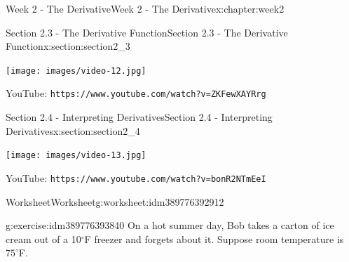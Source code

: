 \documentclass[oneside,10pt,]{book}
\newcommand{\mono}[1]{\texttt{#1}}
\numberwithin{equation}{section}
\newlength{\qrsize}
\newlength{\previewwidth}
\begin{document}
\begin{chapterptx}{Week 2 - The Derivative}{}{Week 2 - The Derivative}{}{}{x:chapter:week2}
\begin{sectionptx}{Section 2.3 - The Derivative Function}{}{Section 2.3 - The Derivative Function}{}{}{x:section:section2_3}
\begin{tcbraster}[raster columns=2, raster column skip=1pt, raster halign=center, raster force size=false, raster left skip=0pt, raster right skip=0pt]
\begin{tcolorbox}[previewstyle, width=\previewwidth]
\texttt{[image: images/video-12.jpg]}%
\end{tcolorbox}%
\begin{tcolorbox}[qrstyle]%
{\hypersetup{urlcolor=black}}%
\end{tcolorbox}%
\begin{tcolorbox}[captionstyle]%
\small YouTube: \mono{https://www.youtube.com/watch?v=ZKFewXAYRrg}\end{tcolorbox}%
\end{tcbraster}%
\end{sectionptx}
%
%
\typeout{************************************************}
\typeout{************************************************}
%
\begin{sectionptx}{Section 2.4 - Interpreting Derivatives}{}{Section 2.4 - Interpreting Derivatives}{}{}{x:section:section2_4}
\setlength{\qrsize}{9em}
\setlength{\previewwidth}{\linewidth}
\addtolength{\previewwidth}{-\qrsize}
\begin{tcbraster}[raster columns=2, raster column skip=1pt, raster halign=center, raster force size=false, raster left skip=0pt, raster right skip=0pt]%
\begin{tcolorbox}[previewstyle, width=\previewwidth]%
\texttt{[image: images/video-13.jpg]}%
\end{tcolorbox}%
\begin{tcolorbox}[qrstyle]%
{\hypersetup{urlcolor=black}}%
\end{tcolorbox}%
\begin{tcolorbox}[captionstyle]%
\small YouTube: \mono{https://www.youtube.com/watch?v=bonR2NTmEeI}\end{tcolorbox}%
\end{tcbraster}%
%
%
\typeout{************************************************}
\typeout{************************************************}
%
\begin{worksheet-subsection}{Worksheet}{}{Worksheet}{}{}{g:worksheet:idm389776392912}
\begin{divisionexercise}{1}{}{}{g:exercise:idm389776393840}%
On a hot summer day, Bob takes a carton of ice cream out of a 10\(^\circ\)F freezer and forgets about it. Suppose room temperature is \(75^\circ\)F.%
%
\begin{enumerate}[label=(\alph*)]

\end{enumerate}
\end{divisionexercise}
\end{worksheet-subsection}
\end{sectionptx}
\end{chapterptx}
\end{document}
